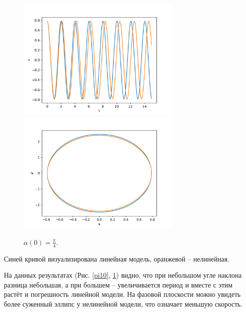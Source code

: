             \begin{figure}[H]
                \centering
                \includegraphics[width=8cm]{pictures/12resonance4.pdf}
                \includegraphics[width=8cm]{pictures/12resonance4p.pdf}
                \caption{$\alpha(0) = \frac{\pi}{4}$.} \label{pi4}
            \end{figure}

            Синей кривой визуализирована линейная модель, оранжевой -- нелинейная.
            
            На данных результатах (Рис. \ref{pi10}, \ref{pi4}) видно, что при небольшом угле наклона разница небольшая, а при большем -- увеличивается период и вместе с этим растёт и погрешность линейной модели. На фазовой плоскости можно увидеть более суженный эллипс у нелинейной модели, что означает меньшую скорость.

